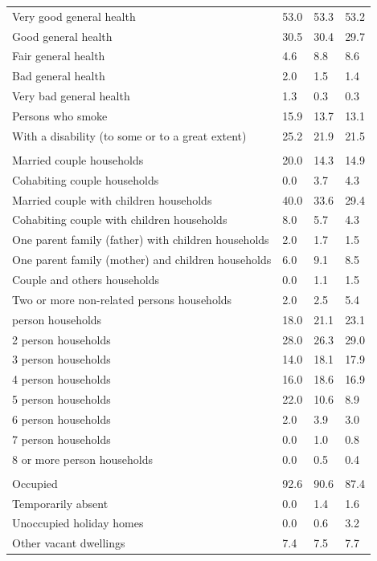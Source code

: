 \documentclass{article}
\begin{document}
\begin{table}[h]
\begin{tabular}{KTTT}
Very good general health & 53.0& 53.3& 53.2\\
Good general health & 30.5& 30.4& 29.7\\
Fair general health & 4.6& 8.8& 8.6\\
Bad general health & 2.0& 1.5& 1.4\\
Very bad general health & 1.3& 0.3& 0.3\\
    \hline
Persons who smoke & 15.9& 13.7& 13.1\\
    \hline
With a disability (to some or to a great extent) & 25.2& 21.9& 21.5\\
\hline
    \\ 
    \hline
Married couple households & 20.0& 14.3& 14.9\\
Cohabiting couple households & 0.0& 3.7& 4.3\\
Married couple with children households & 40.0& 33.6& 29.4\\
Cohabiting couple with children households & 8.0& 5.7& 4.3\\
One parent family (father) with  children households & 2.0& 1.7& 1.5\\
One parent family (mother) and children households & 6.0& 9.1& 8.5\\
Couple and others households  & 0.0& 1.1& 1.5\\
Two or more non-related persons households & 2.0& 2.5& 5.4\\
     person households & 18.0& 21.1& 23.1\\
2 person households & 28.0& 26.3& 29.0\\
3 person households & 14.0& 18.1& 17.9\\
4 person households & 16.0& 18.6& 16.9\\
5 person households & 22.0& 10.6&  8.9\\
6 person households & 2.0& 3.9& 3.0\\
7 person households & 0.0& 1.0& 0.8\\
8 or more person households & 0.0& 0.5& 0.4\\
\hline
    \\ 
    \hline
Occupied & 92.6& 90.6& 87.4\\
Temporarily absent & 0.0& 1.4& 1.6\\
Unoccupied holiday homes & 0.0& 0.6& 3.2\\
Other vacant dwellings & 7.4& 7.5& 7.7\\
\hline
\end{tabular}
\end{table}
\end{document}
